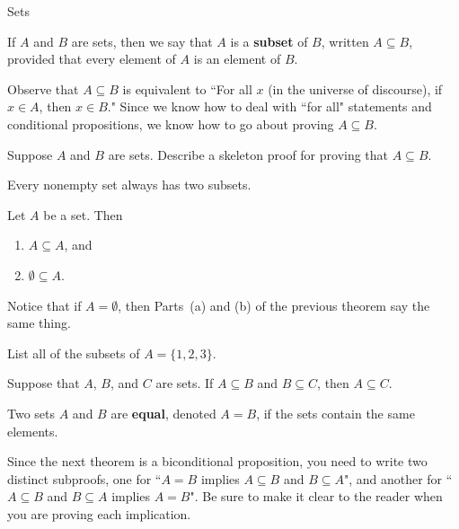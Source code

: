 \begin{section}{Sets}
\begin{definition}
If $A$ and $B$ are sets, then we say that $A$ is a \textbf{subset} of $B$, written $\boxed{A\subseteq B}$, provided that every element of $A$ is an element of $B$.
\end{definition}

Observe that $A\subseteq B$ is equivalent to ``For all $x$ (in the universe of discourse), if $x\in A$, then $x\in B$."  Since we know how to deal with ``for all" statements and conditional propositions, we know how to go about proving $A\subseteq B$.

\begin{problem}
Suppose $A$ and $B$ are sets.  Describe a skeleton proof for proving that $A\subseteq B$.
\end{problem}

Every nonempty set always has two subsets.

\begin{theorem}
Let $A$ be a set.  Then
\begin{enumerate}[label=\textrm{(\alph*)}]
\item $A\subseteq A$, and
\item $\emptyset \subseteq A$.
\end{enumerate}
\end{theorem}

Notice that if $A=\emptyset$, then Parts~(a) and (b) of the previous theorem say the same thing.

\begin{problem}
List all of the subsets of $A=\{1,2,3\}$.  %
\end{problem}

\begin{theorem}
Suppose that $A$, $B$, and $C$ are sets.  If $A\subseteq B$ and $B\subseteq C$, then $A\subseteq C$.
\end{theorem}

\begin{definition}
Two sets $A$ and $B$ are \textbf{equal}, denoted $\boxed{A=B}$, if the sets contain the same elements.
\end{definition}

Since the next theorem is a biconditional proposition, you need to write two distinct subproofs, one for ``$A=B$ implies $A \subseteq B$ and $B \subseteq A$", and another for ``$A \subseteq B$ and $B \subseteq A$ implies $A=B$". Be sure to make it clear to the reader when you are proving each implication.


\end{section}
